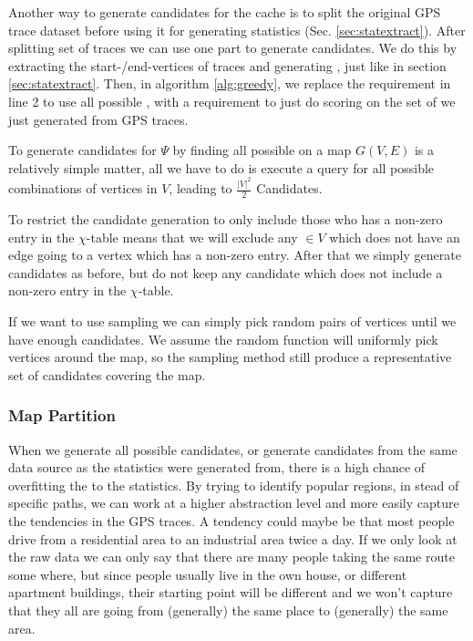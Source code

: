 Another way to generate candidates for the cache is to split the original GPS trace dataset before using it for generating statistics (Sec. \ref{sec:statextract}). 
After splitting set of traces we can use one part to generate candidates. We do this by extracting the start-/end-vertices of traces and generating \spaths, just like in section \ref{sec:statextract}. Then, in algorithm \ref{alg:greedy}, we replace the requirement in line 2 to use all possible \spathsns, with a requirement to just do scoring on the set of \spaths we just generated from GPS traces.



To generate \spath candidates for $\Psi$ by finding all possible \spath on a map $G(V,E)$ is a relatively simple matter, all we have to do is execute a \spath query for all possible combinations of vertices in $V$, leading to $\frac{|V|^2}{2}$ Candidates.

To restrict the candidate generation to only include those who has a non-zero entry in the $\chi$-table means that we will exclude any $ \in V$ which does not have an edge going to a vertex which has a non-zero entry. After that we simply generate candidates as before, but do not keep any candidate which does not include a non-zero entry in the $\chi$-table.

If we want to use sampling we can simply pick random pairs of vertices until we have enough candidates. We assume the random function will uniformly pick vertices around the map, so the sampling method still produce a representative set of candidates covering the map.



\subsubsection{Map Partition}

When we generate all possible \spath candidates, or generate \spath candidates from the same data source as the statistics were generated from, there is a high chance of overfitting the \spaths to the statistics. By trying to identify popular regions, in stead of specific paths, we can work at a higher abstraction level and more easily capture the tendencies in the GPS traces. A tendency could maybe be that most people drive from a residential area to an industrial area twice a day. If we only look at the raw data we can only say that there are many people taking the same route some where, but since people usually live in the own house, or different apartment buildings, their starting point will be different and we won't capture that they all are going from (generally) the same place to (generally) the same area. 

